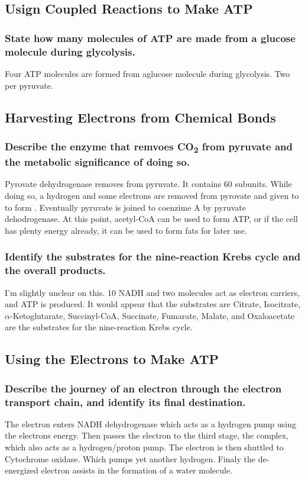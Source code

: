 \documentclass[a4paper]{article}
\begin{document}
\subsection{Usign Coupled Reactions to Make ATP}
\subsubsection{State how many molecules of ATP are made from a glucose molecule during glycolysis.}
Four ATP molecules are formed from aglucose molecule during glycolysis. Two per pyruvate.

\subsection{Harvesting Electrons from Chemical Bonds}
\subsubsection{Describe the enzyme that remvoes CO\textsubscript{2} from pyruvate and the
metabolic significance of doing so.}
Pyrovate dehydrogenase removes  from pyruvate. It contains 60 subunits. While doing so, 
a hydrogen and some electrons are removed from pyrovate and given to  to form .
Eventually pyruvate is joined to coenzime A by pyruvate dehodrogenase. At this point, acetyl-CoA can
be used to form ATP, or if the cell has plenty energy already, it can be used to form fats for later use.

\subsubsection{Identify the substrates for the nine-reaction Krebs cycle and the overall products.}
I'm slightly unclear on this. 10 NADH and two  molecules act as electron carriers, and ATP is produced.
It would appear that the substrates are Citrate, Isocitrate, $\alpha$-Ketoglutarate, Succinyl-CoA, Succinate, Fumarate, 
Malate, and Oxaloacetate are the substrates for the nine-reaction Krebs cycle.


\subsection{Using the Electrons to Make ATP}
\subsubsection{Describe the journey of an electron through the electron transport chain, and 
identify its final destination.}
The electron enters NADH dehydrogenase which acts as a hydrogen pump using the electrons energy. Then
 passes the electron to the third stage, the  complex, which also acts as a 
hydrogen/proton pump. The electron is then shuttled to Cytochrome oxidase. Which pumps yet another hydrogen.
Finaly the de-energized electron assists in the formation of a water molecule.
\end{document}
